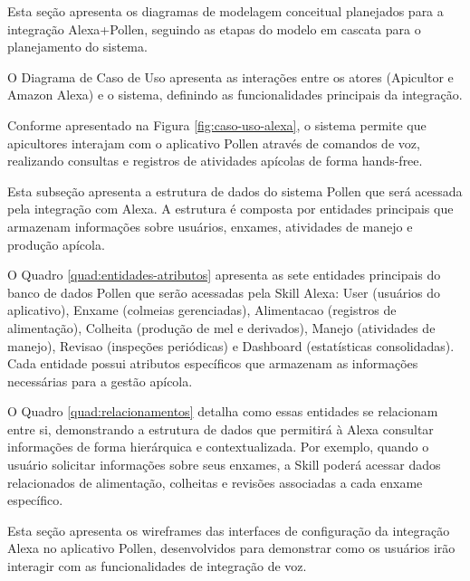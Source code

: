 \label{sec:modelagem-sistema}

Esta seção apresenta os diagramas de modelagem conceitual planejados para a integração Alexa+Pollen, seguindo as etapas do modelo em cascata para o planejamento do sistema.


O Diagrama de Caso de Uso apresenta as interações entre os atores (Apicultor e Amazon Alexa) e o sistema, definindo as funcionalidades principais da integração.



Conforme apresentado na Figura \ref{fig:caso-uso-alexa}, o sistema permite que apicultores interajam com o aplicativo Pollen através de comandos de voz, realizando consultas e registros de atividades apícolas de forma hands-free.


Esta subseção apresenta a estrutura de dados do sistema Pollen que será acessada pela integração com Alexa. A estrutura é composta por entidades principais que armazenam informações sobre usuários, enxames, atividades de manejo e produção apícola.



O Quadro \ref{quad:entidades-atributos} apresenta as sete entidades principais do banco de dados Pollen que serão acessadas pela Skill Alexa: User (usuários do aplicativo), Enxame (colmeias gerenciadas), Alimentacao (registros de alimentação), Colheita (produção de mel e derivados), Manejo (atividades de manejo), Revisao (inspeções periódicas) e Dashboard (estatísticas consolidadas). Cada entidade possui atributos específicos que armazenam as informações necessárias para a gestão apícola.

O Quadro \ref{quad:relacionamentos} detalha como essas entidades se relacionam entre si, demonstrando a estrutura de dados que permitirá à Alexa consultar informações de forma hierárquica e contextualizada. Por exemplo, quando o usuário solicitar informações sobre seus enxames, a Skill poderá acessar dados relacionados de alimentação, colheitas e revisões associadas a cada enxame específico.

\label{sec:interfaces-sistema}

Esta seção apresenta os wireframes das interfaces de configuração da integração Alexa no aplicativo Pollen, desenvolvidos para demonstrar como os usuários irão interagir com as funcionalidades de integração de voz.

